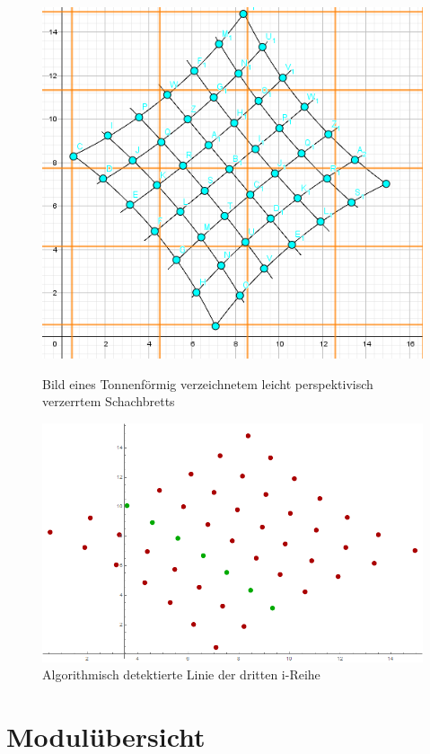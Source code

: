\begin{figure}[!htb]
	\includegraphics[width=\linewidth]{images/extrBsp.png}
	\caption{Bild eines Tonnenförmig verzeichnetem leicht perspektivisch verzerrtem Schachbretts}
	\label{fig:awesome_image1}
	\endminipage\hfill
	\includegraphics[width=\linewidth]{images/AlgExtrBsp.png}
	\caption{Algorithmisch detektierte Linie der dritten i-Reihe}
	\label{fig:awesome_image2}
	\endminipage\hfill
\end{figure}


\section{Modulübersicht}


